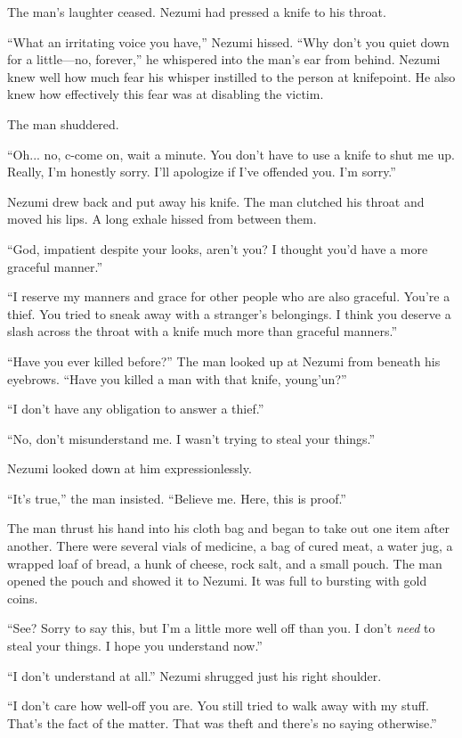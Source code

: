 The man's laughter ceased. Nezumi had pressed a knife to his throat.

``What an irritating voice you have,'' Nezumi hissed. ``Why don't you
quiet down for a little---no, forever,'' he whispered into the man's ear
from behind. Nezumi knew well how much fear his whisper instilled to the
person at knifepoint. He also knew how effectively this fear was at
disabling the victim.

The man shuddered.

``Oh... no, c-come on, wait a minute. You don't have to use a knife to
shut me up. Really, I'm honestly sorry. I'll apologize if I've offended
you. I'm sorry.''

Nezumi drew back and put away his knife. The man clutched his throat and
moved his lips. A long exhale hissed from between them.

``God, impatient despite your looks, aren't you? I thought you'd have a
more graceful manner.''

``I reserve my manners and grace for other people who are also graceful.
You're a thief. You tried to sneak away with a stranger's belongings. I
think you deserve a slash across the throat with a knife much more than
graceful manners.''

``Have you ever killed before?'' The man looked up at Nezumi from
beneath his eyebrows. ``Have you killed a man with that knife,
young'un?''

``I don't have any obligation to answer a thief.''

``No, don't misunderstand me. I wasn't trying to steal your things.''

Nezumi looked down at him expressionlessly.

``It's true,'' the man insisted. ``Believe me. Here, this is proof.''

The man thrust his hand into his cloth bag and began to take out one
item after another. There were several vials of medicine, a bag of cured
meat, a water jug, a wrapped loaf of bread, a hunk of cheese, rock salt,
and a small pouch. The man opened the pouch and showed it to Nezumi. It
was full to bursting with gold coins.

``See? Sorry to say this, but I'm a little more well off than you. I
don't \emph{need} to steal your things. I hope you understand now.''

``I don't understand at all.'' Nezumi shrugged just his right shoulder.~

``I don't care how well-off you are. You still tried to walk away with
my stuff. That's the fact of the matter. That was theft and there's no
saying otherwise.''


